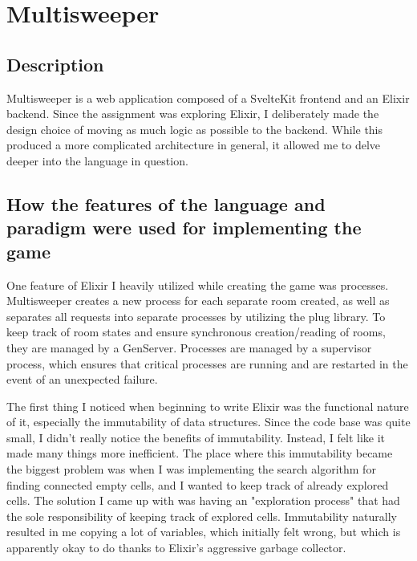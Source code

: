 
\section{Multisweeper}

\subsection{Description}
Multisweeper is a web application composed of a SvelteKit frontend and an Elixir backend. Since the assignment was exploring Elixir, I deliberately made the design choice of moving as much logic as possible to the backend. While this produced a more complicated architecture in general, it allowed me to delve deeper into the language in question.

\subsection{How the features of the language and paradigm were used for implementing the game}
One feature of Elixir I heavily utilized while creating the game was processes. Multisweeper creates a new process for each separate room created, as well as separates all requests into separate processes by utilizing the plug library. To keep track of room states and ensure synchronous creation/reading of rooms, they are managed by a GenServer. Processes are managed by a supervisor process, which ensures that critical processes are running and are restarted in the event of an unexpected failure.

The first thing I noticed when beginning to write Elixir was the functional nature of it, especially the immutability of data structures. Since the code base was quite small, I didn't really notice the benefits of immutability. Instead, I felt like it made many things more inefficient. The place where this immutability became the biggest problem was when I was implementing the search algorithm for finding connected empty cells, and I wanted to keep track of already explored cells. The solution I came up with was having an "exploration process" that had the sole responsibility of keeping track of explored cells. Immutability naturally resulted in me copying a lot of variables, which initially felt wrong, but which is apparently okay to do thanks to Elixir's aggressive garbage collector.

